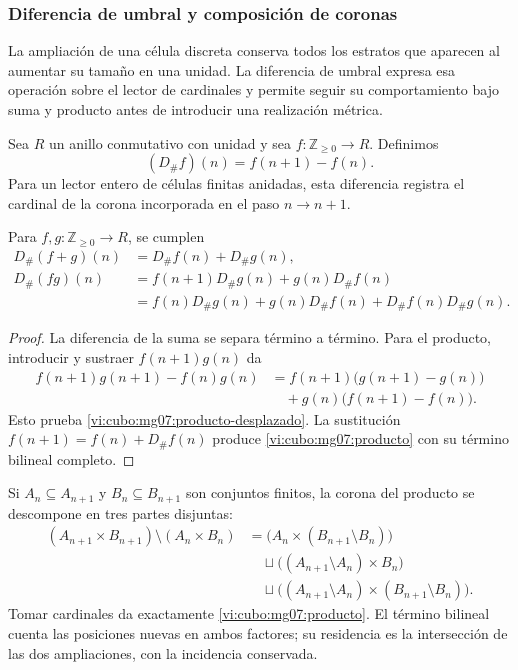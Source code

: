 \subsubsection{Diferencia de umbral y composición de coronas}
\label{vi:cubo:mg07:umbral}

La ampliación de una célula discreta conserva todos los estratos que
aparecen al aumentar su tamaño en una unidad. La diferencia de umbral
expresa esa operación sobre el lector de cardinales y permite seguir
su comportamiento bajo suma y producto antes de introducir una
realización métrica.

\begin{definition}
Sea \(R\) un anillo conmutativo con unidad y sea
\(f:\mathbb Z_{\geq0}\to R\). Definimos
\begin{equation}
 (D_\#f)(n)=f(n+1)-f(n).
 \label{vi:cubo:mg07:definicion}
\end{equation}
Para un lector entero de células finitas anidadas, esta diferencia
registra el cardinal de la corona incorporada en el paso \(n\to n+1\).
\end{definition}

\begin{proposition}
Para \(f,g:\mathbb Z_{\geq0}\to R\), se cumplen
\begin{align}
 D_\#(f+g)(n)&=D_\#f(n)+D_\#g(n),
 \label{vi:cubo:mg07:aditividad}\\
 D_\#(fg)(n)&=f(n+1)D_\#g(n)+g(n)D_\#f(n)
 \label{vi:cubo:mg07:producto-desplazado}\\
 &=f(n)D_\#g(n)+g(n)D_\#f(n)
   +D_\#f(n)D_\#g(n).
 \label{vi:cubo:mg07:producto}
\end{align}
\end{proposition}

\begin{proof}
La diferencia de la suma se separa término a término. Para el producto,
introducir y sustraer \(f(n+1)g(n)\) da
\[
 \begin{split}
 f(n+1)g(n+1)-f(n)g(n)
 &=f(n+1)\bigl(g(n+1)-g(n)\bigr)\\
 &\quad+g(n)\bigl(f(n+1)-f(n)\bigr).
 \end{split}
\]
Esto prueba \eqref{vi:cubo:mg07:producto-desplazado}. La sustitución
\(f(n+1)=f(n)+D_\#f(n)\) produce
\eqref{vi:cubo:mg07:producto} con su término bilineal completo.
\end{proof}

Si \(A_n\subseteq A_{n+1}\) y \(B_n\subseteq B_{n+1}\) son
conjuntos finitos, la corona del producto se descompone en tres partes
disjuntas:
\[
 \begin{split}
 (A_{n+1}\times B_{n+1})\setminus(A_n\times B_n)
 &=\bigl(A_n\times(B_{n+1}\setminus B_n)\bigr)\\
 &\quad\sqcup\bigl((A_{n+1}\setminus A_n)\times B_n\bigr)\\
 &\quad\sqcup\bigl((A_{n+1}\setminus A_n)
                 \times(B_{n+1}\setminus B_n)\bigr).
 \end{split}
\]
Tomar cardinales da exactamente \eqref{vi:cubo:mg07:producto}. El término
bilineal cuenta las posiciones nuevas en ambos factores; su residencia
es la intersección de las dos ampliaciones, con la incidencia conservada.

